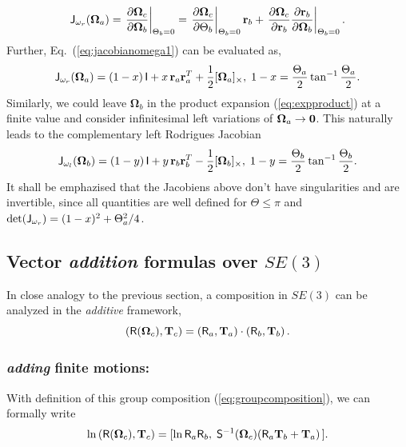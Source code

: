 \documentclass[conference]{IEEEtran}
\newcommand{\bfOmega}{\boldsymbol{\Omega}}
\newcommand{\beq}{\begin{equation}}
\newcommand{\eeq}{\end{equation}}
\begin{document}
\begin{appendix}
\beq
    {\sf J}_{\omega_r}(\bfOmega_a) = 
    \left.{\partial \bfOmega_c \over \partial \bfOmega_b}\right|_{\Theta_b=0}=
    \left.{\partial \bfOmega_c \over \partial \Theta_b}\right|_{\Theta_b=0} {\bf r}_b+
    \left.{\partial \bfOmega_c \over \partial {\bf r}_b} {\partial {\bf r}_b \over \partial \bfOmega_b}
    \right|_{\Theta_b=0}. \label{eq:jacobianomega1}
\eeq
Further, Eq.~(\ref{eq:jacobianomega1}) can be evaluated as,
\beq
    {\sf J}_{\omega_r}(\bfOmega_a) = (1-x)\, {\sf I}+ x\, {\bf r}_a{\bf r}_a^T + {1\over 2}[\bfOmega_a]_\times,
    \; 1-x = {\Theta_a\over 2}\tan^{-1}{\Theta_a\over 2}.
    \label{eq:RodweinormanJ}
\eeq
Similarly, we could leave $\bfOmega_b$ in the product expansion (\ref{eq:expproduct}) at a finite value
and consider infinitesimal left variations of $\bfOmega_a\rightarrow {\bf 0}$. This naturally leads to the
complementary left Rodrigues Jacobian
\beq
    {\sf J}_{\omega_l} (\bfOmega_b) = (1-y)\, {\sf I}+ y\, {\bf r}_b{\bf r}_b^T - {1\over 2}[\bfOmega_b]_\times,
    \; 1-y = {\Theta_b\over 2}\tan^{-1}{\Theta_b\over 2}.
\eeq
It shall be emphazised that the Jacobiens above don't have singularities and are invertible, since all quantities
are well defined for $\Theta\leq\pi$ and $\mathrm{det}( {\sf J}_{\omega_r}) = (1-x)^2 + \Theta_a^2/4$.

\subsection{Vector {\em addition} formulas over $SE(3)$}
In close analogy to the previous section, a composition in $SE(3)$ can be analyzed
in the {\em additive} framework,
\beq
    ({\sf R}(\bfOmega_c),{\bf T}_c)=({\sf R}_a,{\bf T}_a)\cdot
    ({\sf R}_b,{\bf T}_b)\, .
\eeq
\subsubsection{{\em adding} finite motions:}
With definition of this group composition (\ref{eq:groupcomposition}), we can formally write
\beq
    \ln \, ({\sf R}(\bfOmega_c),{\bf T}_c) = [\ln {\sf R}_a{\sf R}_b,\;
    {\sf S}^{-1}(\bfOmega_c) ({\sf R}_a{\bf T}_b + {\bf T}_a) \, ].
    \label{eq:addfiniteSE3}
\eeq

\end{appendix}
\end{document}
